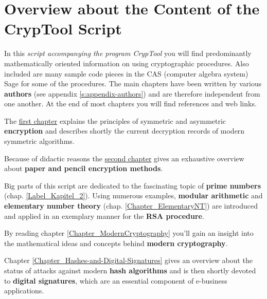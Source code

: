 
\clearpage{}
{}
\chapter*{Overview about the Content of the CrypTool Script}  

\parskip 4pt
\noindent In this {\em script accompanying the program CrypTool} 
you will find predominantly mathematically oriented information on using
cryptographic procedures. Also included are many sample code pieces in the CAS
(computer algebra system) Sage for some of the procedures.
The main chapters have been written by various {\bf authors}
(see appendix \ref{s:appendix-authors}) %
and are therefore independent from one another. At the end of most chapters
you will find references and web links.

The \hyperlink{Kapitel_1}{first chapter} explains the principles of symmetric
and asymmetric {\bf encryption} and describes shortly the current decryption
records of modern symmetric algorithms.

Because of didactic reasons the \hyperlink{Kapitel_PaperandPencil}
{second chapter} gives an exhaustive overview
about {\bf paper and pencil encryption methods}.

Big parts of this script are dedicated to the fascinating topic of 
{\bf prime numbers} (chap. \ref{Label_Kapitel_2}).
Using numerous examples,
{\bf modular arithmetic} and 
{\bf elementary number theory} (chap. \ref{Chapter_ElementaryNT})
are introduced and applied in an exemplary manner for the {\bf RSA procedure}.

By reading chapter \ref{Chapter_ModernCryptography}
you'll gain an insight into the mathematical ideas and concepts behind 
{\bf modern cryptography}.

Chapter \ref{Chapter_Hashes-and-Digital-Signatures} gives
an overview about the status of attacks against modern {\bf hash algorithms}
and is then shortly devoted to {\bf digital signatures}, 
which are an essential component of e-business applications.

